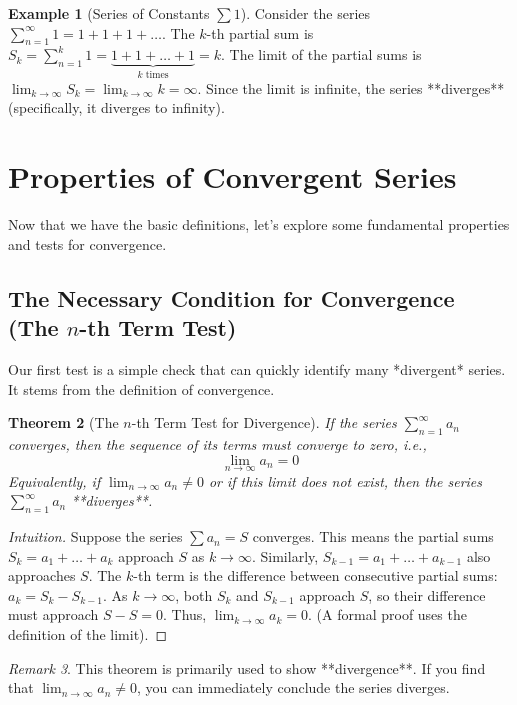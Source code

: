 \documentclass[11pt]{article}
\newtheorem{theorem}{Theorem}[section]
\theoremstyle{definition}
\newtheorem{example}[theorem]{Example}
\theoremstyle{remark}
\newtheorem{remark}[theorem]{Remark}
\begin{document}
\begin{example}[Series of Constants $\sum 1$]
Consider the series $\sum_{n=1}^{\infty} 1 = 1 + 1 + 1 + \dots$.
The $k$-th partial sum is $S_k = \sum_{n=1}^{k} 1 = \underbrace{1 + 1 + \dots + 1}_{k \text{ times}} = k$.
The limit of the partial sums is $\lim_{k \to \infty} S_k = \lim_{k \to \infty} k = \infty$.
Since the limit is infinite, the series **diverges** (specifically, it diverges to infinity).
\end{example}

\section{Properties of Convergent Series}

Now that we have the basic definitions, let's explore some fundamental properties and tests for convergence.

\subsection{The Necessary Condition for Convergence (The $n$-th Term Test)}

Our first test is a simple check that can quickly identify many *divergent* series. It stems from the definition of convergence.

\begin{theorem}[The $n$-th Term Test for Divergence]
If the series $\sum_{n=1}^{\infty} a_n$ converges, then the sequence of its terms must converge to zero, i.e.,
\[ \lim_{n \to \infty} a_n = 0 \]
Equivalently, if $\lim_{n \to \infty} a_n \neq 0$ or if this limit does not exist, then the series $\sum_{n=1}^{\infty} a_n$ **diverges**.
\end{theorem}

\begin{proof}[Intuition]
Suppose the series $\sum a_n = S$ converges. This means the partial sums $S_k = a_1 + \dots + a_k$ approach $S$ as $k \to \infty$. Similarly, $S_{k-1} = a_1 + \dots + a_{k-1}$ also approaches $S$. The $k$-th term is the difference between consecutive partial sums: $a_k = S_k - S_{k-1}$. As $k \to \infty$, both $S_k$ and $S_{k-1}$ approach $S$, so their difference must approach $S - S = 0$. Thus, $\lim_{k \to \infty} a_k = 0$. (A formal proof uses the definition of the limit).
\end{proof}

\begin{remark}
This theorem is primarily used to show **divergence**. If you find that $\lim_{n \to \infty} a_n \neq 0$, you can immediately conclude the series diverges.
\end{remark}
\end{document}
